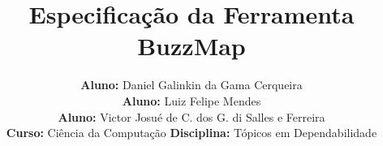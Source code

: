 \documentclass[a4paper, 12pt]{article}
\title{Especificação da Ferramenta BuzzMap}
\author{\textbf{Aluno:} Daniel Galinkin da Gama Cerqueira \\
        \textbf{Aluno:} Luiz Felipe Mendes \\ 
        \textbf{Aluno:} Victor Josué de C. dos G. di Salles e Ferreira \\ 
        \textbf{Curso:} Ciência da Computação
        \textbf{Disciplina:} Tópicos em Dependabilidade   
       }
\begin{document}
\begin{titlepage}
\maketitle
\thispagestyle{empty}
\end{titlepage}
\pagebreak










\nocite{htmlcxx}


\end{document}
